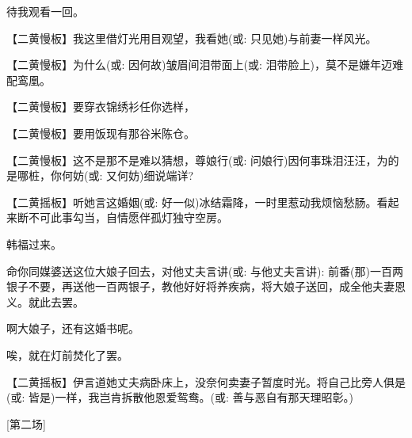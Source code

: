{待我观看一回。}

\setlength{\hangindent}{60pt} {【{\akai 二黄慢板}】我这里借灯光用目观望，我看她({\akai 或}: 只见她)与前妻一样风光。}

\setlength{\hangindent}{60pt} {【{\akai 二黄慢板}】为什么({\akai 或}: 因何故)皱眉间泪带面上({\akai 或}: 泪带脸上)，莫不是嫌年迈难配鸾凰。}

\setlength{\hangindent}{60pt} {【{\akai 二黄慢板}】要穿衣锦绣衫任你选样，}

\setlength{\hangindent}{60pt} {【{\akai 二黄慢板}】要用饭现有那谷米陈仓。}

\setlength{\hangindent}{60pt} {【{\akai 二黄慢板}】这不是那不是难以猜想，尊娘行({\akai 或}: 问娘行)因何事珠泪汪汪，为的是哪桩，你何妨({\akai 或}: 又何妨)细说端详?}

\setlength{\hangindent}{60pt} {【{\akai 二黄摇板}】听她言这婚姻({\akai 或}: 好一似)冰结霜降，一时里惹动我烦恼愁肠。看起来断不可此事勾当，自情愿伴孤灯独守空房。}

{韩福过来。}

{命你同媒婆送这位大娘子回去，对他丈夫言讲({\akai 或}: 与他丈夫言讲): 前番(那)一百两银子不要，再送他一百两银子，教他好好将养疾病，将大娘子送回，成全他夫妻恩义。就此去罢。}

{啊大娘子，还有这婚书呢。}

{唉，就在灯前焚化了罢。}

\setlength{\hangindent}{60pt} {【{\akai 二黄摇板}】伊言道她丈夫病卧床上，没奈何卖妻子暂度时光。将自己比旁人俱是({\akai 或}: 皆是)一样，我岂肯拆散他恩爱鸳鸯。({\akai 或}: 善与恶自有那天理昭彰。)}

{{[}第二场{]}}


